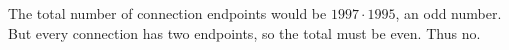 The total number of connection endpoints would be $1997\cdot1995$, an odd number. But every connection has two endpoints, so the total must be even. Thus $\boxed{\text{no}}$.
